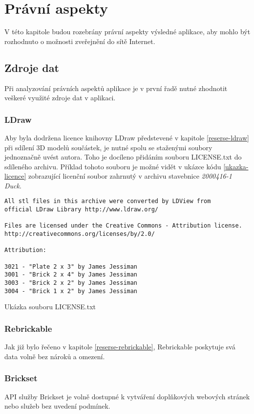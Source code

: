 \chapter{Právní aspekty} 
V této kapitole budou rozebrány právní aspekty výsledné aplikace, aby mohlo být rozhodnuto o možnosti zveřejnění do sítě Internet. 

\section{Zdroje dat}
Při analyzování právních aspektů aplikace je v první řadě nutné zhodnotit veškeré využité zdroje dat v aplikaci. 

\subsection{LDraw}
Aby byla dodržena licence knihovny LDraw předstevené v kapitole \ref{reserse-ldraw} při sdílení 3D modelů součástek, je nutné spolu se staženými soubory jednoznačně uvést autora. Toho je docíleno přidáním souboru LICENSE.txt do sdíleného archivu. Příklad tohoto souboru je možné vidět v ukázce kódu \ref{ukazka-licence} zobrazující licenční soubor zahrnutý v archivu stavebnice \textit{2000416-1 Duck}.

\begin{listing}[htbp]
        \begin{verbatim}
All stl files in this archive were converted by LDView from 
official LDraw Library http://www.ldraw.org/

Files are licensed under the Creative Commons - Attribution license.
http://creativecommons.org/licenses/by/2.0/

Attribution:

3021 - "Plate 2 x 3" by James Jessiman
3001 - "Brick 2 x 4" by James Jessiman
3003 - "Brick 2 x 2" by James Jessiman
3004 - "Brick 1 x 2" by James Jessiman
        \end{verbatim}
    \caption{Ukázka souboru LICENSE.txt\label{ukazka-licence}}
\end{listing}

\subsection{Rebrickable}
Jak již bylo řečeno v kapitole \ref{reserse-rebrickable}, Rebrickable poskytuje svá data volně bez nároků a omezení.

\subsection{Brickset}
API služby Brickset je volně dostupné k vytváření doplňkových webových stránek nebo služeb bez uvedení podmínek. \autocite{brickset:key} 

